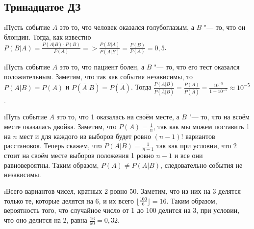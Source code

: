 \subsection{Тринадцатое ДЗ}


\i Пусть событие $A$ это то, что человек оказался голубоглазым, а $B$ "--- то, что он блондин. Тогда, как известно $P(B|A) = \frac{P(A|B)\cdot P(B)}{P(A)} => \frac{P(B|A)}{P(A|B)} = \frac{P(B)}{P(A)} = 0{,}5$.

\i Пусть событие $A$ это то, что пациент болен, а $B$ "--- то, что его тест оказался положительным. Заметим, что так как события независимы, то $P(A|B) = P(A)$ и $P(\overline{A}|B) = P(\overline{A})$. Тогда $\frac{P(A|B)}{P(\overline{A}|B)} = \frac{P(A)}{P(\overline{A})} = \frac{10^{-5}}{1-10^{-5}} \approx 10^{-5}$.

\i Путь событие $A$ это то, что 1 оказалась на своём месте, а $B$ "--- то, что на всоём месте оказалась двойка. Заметим, что $P(A) = \frac{1}{n}$, так как мы можем поставить 1 на $n$ мест и для каждого из выборов будет ровно $(n-1)!$ вариантов расстановок. Теперь скажем, что $P(A|B) = \frac{1}{n-1}$ так как при условии, что 2 стоит на своём месте выборов положения 1 ровно $n-1$ и все они равновероятны. Таким образом, $P(A) \ne P(A|B)$, следовательно события не независимы.

\i Всего вариантов чисел, кратных 2 ровно 50. Заметим, что из них на 3 делятся только те, которые делятся на 6, и их всего $\lfloor\frac{100}{6}\rfloor = 16$. Таким образом, вероятность того, что случайное число от 1 до 100 делится на 3, при условии, что оно делится на 2, равна $\frac{16}{50} = 0{,}32$.

